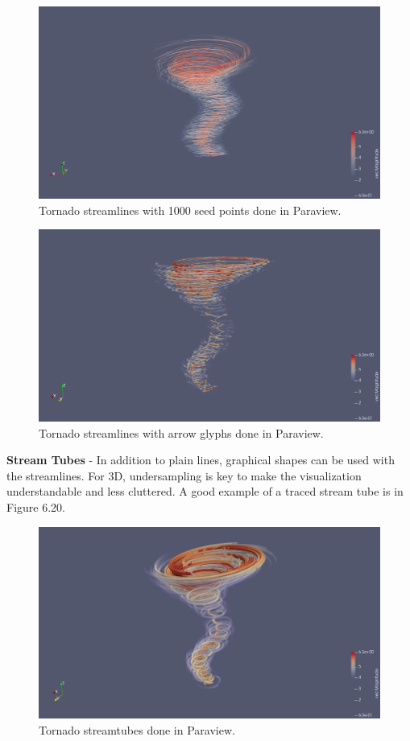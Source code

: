 \documentclass{article}
\begin{document}
\begin{figure}[H]
\caption{Tornado streamlines with 1000 seed points done in Paraview.}
\centering
\includegraphics[scale=.35]{tornado_streamlines_1000_points_pv.png}
\end{figure}

\begin{figure}[H]
\caption{Tornado streamlines with arrow glyphs done in Paraview.}
\centering
\includegraphics[scale=.35]{tornado_glyphs_streamlines_pv.png}
\end{figure}


\textbf{Stream Tubes} - In addition to plain lines, graphical shapes can be used with the streamlines. For 3D, undersampling is key to make the visualization understandable and less cluttered. A good example of a traced stream tube is in Figure 6.20.

\begin{figure}[H]
\caption{Tornado streamtubes done in Paraview.}
\centering
\includegraphics[scale=.35]{tornado_stream_tubes_pv.png}
\end{figure}
\end{document}
